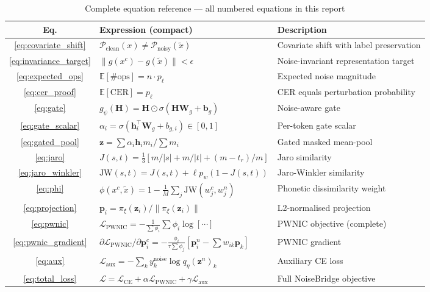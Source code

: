 \documentclass[12pt,a4paper]{report}
\newcommand{\PWNIC}{\mathcal{L}_{\mathrm{PWNIC}}}
\newcommand{\LCE}{\mathcal{L}_{\mathrm{CE}}}
\newcommand{\Laux}{\mathcal{L}_{\mathrm{aux}}}
\newcommand{\Ltot}{\mathcal{L}}
\newcommand{\JW}{\mathrm{JW}}
\begin{document}
\begin{table}[H]
\centering
\caption{Complete equation reference --- all numbered equations in this report}
\label{tab:eq_ref}
\small
\begin{tabular}{clp{6cm}}
\toprule
\textbf{Eq.} & \textbf{Expression (compact)} & \textbf{Description}\\
\midrule
\eqref{eq:covariate_shift} & $\mathcal{P}_{\text{clean}}(x) \neq \mathcal{P}_{\text{noisy}}(\tilde{x})$ & Covariate shift with label preservation \\
\eqref{eq:invariance_target} & $\|g(x^c) - g(\tilde{x})\| < \epsilon$ & Noise-invariant representation target \\
\eqref{eq:expected_ops} & $\mathbb{E}[\#\text{ops}] = n \cdot p_\ell$ & Expected noise magnitude \\
\eqref{eq:cer_proof} & $\mathbb{E}[\mathrm{CER}] = p_\ell$ & CER equals perturbation probability \\
\eqref{eq:gate} & $g_\psi(\mathbf{H}) = \mathbf{H} \odot \sigma(\mathbf{H}\mathbf{W}_g + \mathbf{b}_g)$ & Noise-aware gate \\
\eqref{eq:gate_scalar} & $\alpha_i = \sigma(\mathbf{h}_i^\top \mathbf{W}_g + b_{g,i}) \in [0,1]$ & Per-token gate scalar \\
\eqref{eq:gated_pool} & $\mathbf{z} = \sum \alpha_i \mathbf{h}_i m_i / \sum m_i$ & Gated masked mean-pool \\
\eqref{eq:jaro} & $J(s,t) = \frac{1}{3}[m/|s| + m/|t| + (m{-}t_r)/m]$ & Jaro similarity \\
\eqref{eq:jaro_winkler} & $\JW(s,t) = J(s,t) + \ell p_w(1 - J(s,t))$ & Jaro-Winkler similarity \\
\eqref{eq:phi} & $\phi(x^c, \tilde{x}) = 1 - \frac{1}{M}\sum_j \JW(w_j^c, w_j^n)$ & Phonetic dissimilarity weight \\
\eqref{eq:projection} & $\mathbf{p}_i = \pi_\xi(\mathbf{z}_i) / \|\pi_\xi(\mathbf{z}_i)\|$ & L2-normalised projection \\
\eqref{eq:pwnic} & $\PWNIC = -\frac{1}{\sum\phi_i}\sum\phi_i \log[\cdots]$ & PWNIC objective (complete) \\
\eqref{eq:pwnic_gradient} & $\partial\PWNIC/\partial\mathbf{p}_i^c = -\frac{\phi_i}{\tau\sum\phi_j}[\mathbf{p}_i^n - \sum w_{ik}\mathbf{p}_k]$ & PWNIC gradient \\
\eqref{eq:aux} & $\Laux = -\sum_k y_k^{\text{noise}} \log q_\eta(\mathbf{z}^n)_k$ & Auxiliary CE loss \\
\eqref{eq:total_loss} & $\Ltot = \LCE + \alpha\PWNIC + \gamma\Laux$ & Full NoiseBridge objective \\

\end{tabular}
\end{table}
\end{document}
